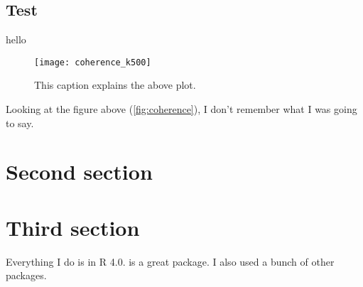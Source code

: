 \subsection{Test}
hello

\lipsum[3-4]

\begin{figure}[h]
	\centering
	\texttt{[image: coherence\_k500]}
	\caption{\label{fig:coherence}This caption explains the above plot.}
\end{figure}

\lipsum[5]
Looking at the figure above (\autoref{fig:coherence}), I don't remember what I was going to say.


\section{Second section}

\lipsum[6-7]

\section{Third section}

Everything I do is in R 4.0\citep{R-4.0.0}. \citep{purrr} is a great package. I also used a
bunch of other packages\citep{qs,dplyr,ggplot2}.
